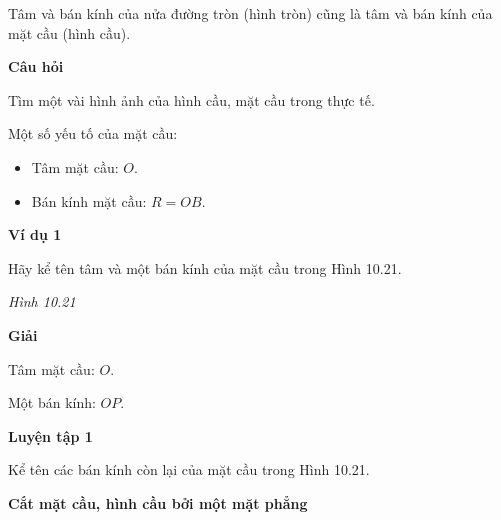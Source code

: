 \begin{lesson}
    Tâm và bán kính của nửa đường tròn (hình tròn) cũng là tâm và bán kính của mặt cầu (hình cầu).

    \textbf{Câu hỏi}

    Tìm một vài hình ảnh của hình cầu, mặt cầu trong thực tế.

    \answerline
    \answerline

    \begin{keyconcept}
        Một số yếu tố của mặt cầu:
        \begin{itemize}
            \item Tâm mặt cầu: $O$.
            \item Bán kính mặt cầu: $R=OB$.
        \end{itemize}
    \end{keyconcept}

    \textbf{Ví dụ 1}

    Hãy kể tên tâm và một bán kính của mặt cầu trong Hình 10.21.

    \begin{center}

        \textit{Hình 10.21}
    \end{center}

    \textbf{Giải}

    Tâm mặt cầu: $O$.

    Một bán kính: $OP$.

    \textbf{Luyện tập 1}

    Kể tên các bán kính còn lại của mặt cầu trong Hình 10.21.

    \answerline

    \textbf{Cắt mặt cầu, hình cầu bởi một mặt phẳng}


\end{lesson}
